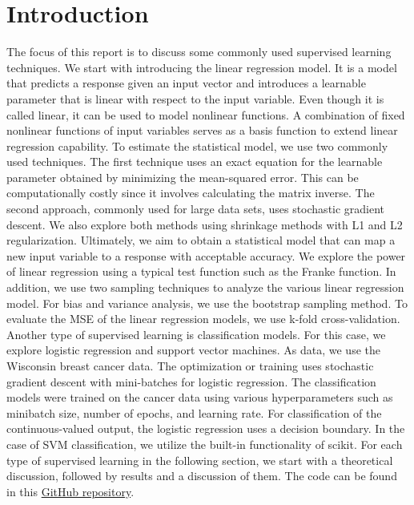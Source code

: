 \section{Introduction} \label{sec:introduction}

The focus of this report is to discuss some commonly used supervised learning techniques. \newline \newline
We start with introducing the linear regression model. It is a model that predicts a response given an input vector and introduces a learnable parameter that is linear with respect to the input variable. Even though it is called linear, it can be used to model nonlinear functions. A combination of fixed nonlinear functions of input variables serves as a basis function to extend linear regression capability. To estimate the statistical model, we use two commonly used techniques. The first technique uses an exact equation for the learnable parameter obtained by minimizing the mean-squared error. This can be computationally costly since it involves calculating the matrix inverse. The second approach, commonly used for large data sets, uses stochastic gradient descent. We also explore both methods using shrinkage methods with L1 and L2 regularization. Ultimately, we aim to obtain a statistical model that can map a new input variable to a response with acceptable accuracy. \newline \newline
We explore the power of linear regression using a typical test function such as the Franke function. In addition, we use two sampling techniques to analyze the various linear regression model. For bias and variance analysis, we use the bootstrap sampling method. To evaluate the MSE of the linear regression models, we use k-fold cross-validation. \newline \newline
Another type of supervised learning is classification models. For this case, we explore logistic regression and support vector machines. As data, we use the Wisconsin breast cancer data. The optimization or training uses stochastic gradient descent with mini-batches for logistic regression. The classification models were trained on the cancer data using various hyperparameters such as minibatch size, number of epochs, and learning rate. For classification of the continuous-valued output, the logistic regression uses a decision boundary. In the case of SVM classification, we utilize the built-in functionality of scikit. \newline \newline
For each type of supervised learning in the following section, we start with a theoretical discussion, followed by results and a discussion of them. \newline \newline
The code can be found in this \href{https://github.com/am-kaiser/CompSci-Project-1}{GitHub repository}.
